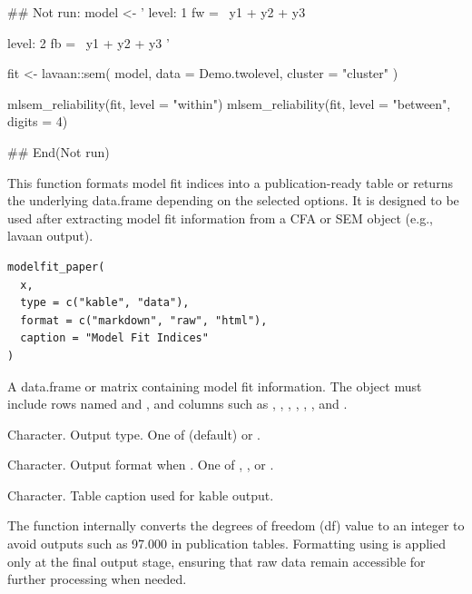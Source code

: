 \documentclass[a4paper]{book}
\begin{document}
%
\begin{Examples}
\begin{ExampleCode}
\#\# Not run: 
model <- '
level: 1
  fw =~ y1 + y2 + y3

level: 2
  fb =~ y1 + y2 + y3
'

fit <- lavaan::sem(
  model,
  data    = Demo.twolevel,
  cluster = "cluster"
)

mlsem_reliability(fit, level = "within")
mlsem_reliability(fit, level = "between", digits = 4)

## End(Not run)
\end{ExampleCode}
\end{Examples}

%
\begin{Description}
This function formats model fit indices into a publication-ready table
or returns the underlying data.frame depending on the selected options.
It is designed to be used after extracting model fit information
from a CFA or SEM object (e.g., lavaan output).
\end{Description}
%
\begin{Usage}
\begin{verbatim}
modelfit_paper(
  x,
  type = c("kable", "data"),
  format = c("markdown", "raw", "html"),
  caption = "Model Fit Indices"
)
\end{verbatim}
\end{Usage}
%
\begin{Arguments}
\begin{ldescription}
\item[\code{x}] A data.frame or matrix containing model fit information.
The object must include rows named  and ,
and columns such as , , ,
, , , and .

\item[\code{type}] Character. Output type.
One of  (default) or .

\item[\code{format}] Character. Output format when .
One of , , or .

\item[\code{caption}] Character. Table caption used for kable output.
\end{ldescription}
\end{Arguments}
%
\begin{Details}
The function internally converts the degrees of freedom (df) value
to an integer to avoid outputs such as 97.000 in publication tables.
Formatting using  is applied only at the final
output stage, ensuring that raw data remain accessible for further
processing when needed.
\end{Details}
\end{document}
